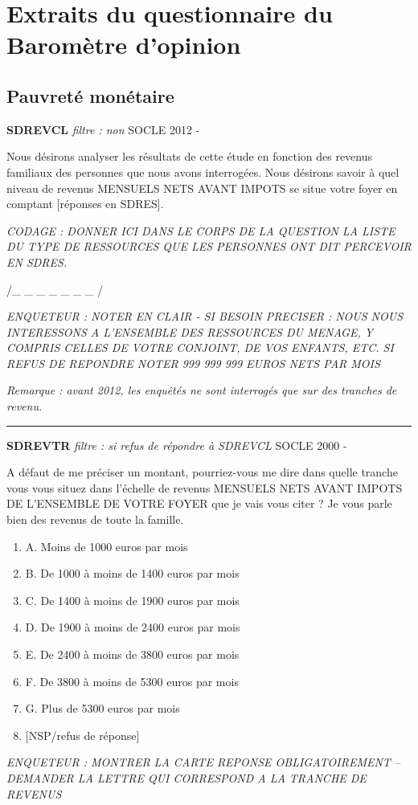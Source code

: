 \documentclass[12pt,a4paper]{reedthesis}
\providecommand{\tightlist}{%
  \setlength{\itemsep}{0pt}\setlength{\parskip}{0pt}}
\begin{document}
\appendix

\hypertarget{annexequestio}{%
\chapter{Extraits du questionnaire du Baromètre d'opinion}\label{annexequestio}}

\hypertarget{pauvretuxe9-monuxe9taire}{%
\section{Pauvreté monétaire}\label{pauvretuxe9-monuxe9taire}}

\textbf{SDREVCL} \emph{filtre : non} SOCLE 2012 -

Nous désirons analyser les résultats de cette étude en fonction des revenus familiaux des personnes que nous avons interrogées.
Nous désirons savoir à quel niveau de revenus MENSUELS NETS AVANT IMPOTS se situe votre foyer en comptant {[}réponses en SDRES{]}.

\emph{CODAGE : DONNER ICI DANS LE CORPS DE LA QUESTION LA LISTE DU TYPE DE RESSOURCES QUE LES PERSONNES ONT DIT PERCEVOIR EN SDRES.}

/\_ \_ \_ \_ \_ \_ \_ /

\emph{ENQUETEUR : NOTER EN CLAIR - SI BESOIN PRECISER : NOUS NOUS INTERESSONS A L'ENSEMBLE DES RESSOURCES DU MENAGE, Y COMPRIS CELLES DE VOTRE CONJOINT, DE VOS ENFANTS, ETC. SI REFUS DE REPONDRE NOTER 999 999 999 EUROS NETS PAR MOIS}

\emph{Remarque : avant 2012, les enquêtés ne sont interrogés que sur des tranches de revenu.}
\begin{center}\rule{0.5\linewidth}{0.5pt}\end{center}

\textbf{SDREVTR} \emph{filtre : si refus de répondre à SDREVCL} SOCLE 2000 -

A défaut de me préciser un montant, pourriez-vous me dire dans quelle tranche vous vous situez dans l'échelle de revenus MENSUELS NETS AVANT IMPOTS DE L'ENSEMBLE DE VOTRE FOYER que je vais vous citer ? Je vous parle bien des revenus de toute la famille.
\begin{enumerate}
\def\labelenumi{\arabic{enumi}.}
\tightlist
\item
  A. Moins de 1000 euros par mois\\
\item
  B. De 1000 à moins de 1400 euros par mois\\
\item
  C. De 1400 à moins de 1900 euros par mois
\item
  D. De 1900 à moins de 2400 euros par mois\\
\item
  E. De 2400 à moins de 3800 euros par mois
\item
  F. De 3800 à moins de 5300 euros par mois
\item
  G. Plus de 5300 euros par mois
\item
  {[}NSP/refus de réponse{]}
\end{enumerate}
\emph{ENQUETEUR : MONTRER LA CARTE REPONSE OBLIGATOIREMENT -- DEMANDER LA LETTRE QUI CORRESPOND A LA TRANCHE DE REVENUS}
\end{document}
